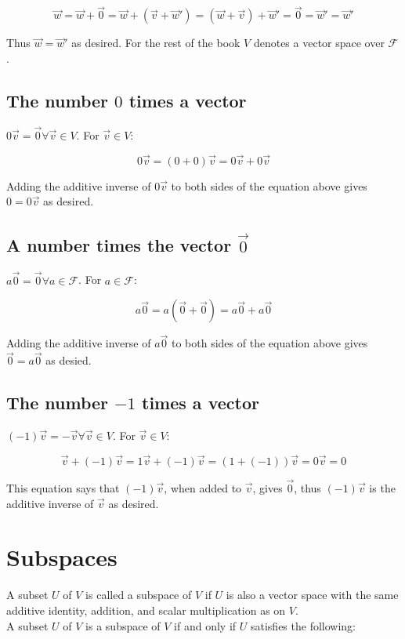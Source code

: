   $$\vec{w} = \vec{w} + \vec{0} = \vec{w} + (\vec{v} + \vec{w}') = (\vec{w} + \vec{v}) + \vec{w} ' = \vec{0} = \vec{w}' = \vec{w}'$$

  Thus $\vec{w} = \vec{w}'$ as desired.
  For the rest of the book $V$ denotes a vector space over $\mathcal{F}$.

  \subsection{The number $0$ times a vector}
  $0\vec{v} = \vec{0}\forall \vec{v}\in V$.
  For $\vec{v}\in V$:

  $$0\vec{v} = (0+0)\vec{v} = 0\vec{v} + 0\vec{v}$$

  Adding the additive inverse of $0\vec{v}$ to both sides of the equation above gives $0 = 0\vec{v}$ as desired.

  \subsection{A number times the vector $\vec{0}$}
  $a\vec{0} = \vec{0}\forall a\in\mathcal{F}$.
  For $a\in\mathcal{F}$:

  $$a\vec{0} = a(\vec{0} + \vec{0}) = a\vec{0} + a\vec{0}$$

  Adding the additive inverse of $a\vec{0}$ to both sides of the equation above gives $\vec{0} = a\vec{0}$ as desied.

  \subsection{The number $-1$ times a vector}
  $(-1)\vec{v} = -\vec{v}\forall \vec{v}\in V$.
  For $\vec{v}\in V$:

  $$\vec{v} + (-1)\vec{v} = 1\vec{v} + (-1)\vec{v} = (1 + (-1))\vec{v} = 0\vec{v} = 0$$

  This equation says that $(-1)\vec{v}$, when added to $\vec{v}$, gives $\vec{0}$, thus $(-1)\vec{v}$ is the additive inverse of $\vec{v}$ as desired.

\section{Subspaces}
A subset $U$ of $V$ is called a subspace of $V$ if $U$ is also a vector space with the same additive identity, addition, and scalar multiplication as on $V$.\\
A subset $U$ of $V$ is a subspace of $V$ if and only if $U$ satisfies the following:


